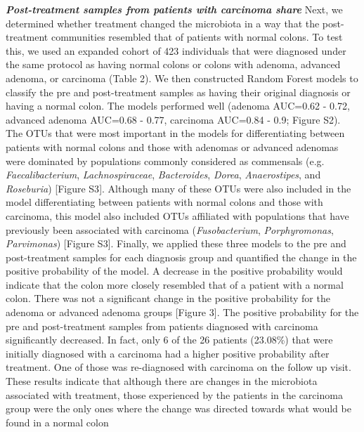 \documentclass[12pt,]{article}
\begin{document}
\textbf{\emph{Post-treatment samples from patients with carcinoma
share}} Next, we determined whether treatment changed the microbiota in
a way that the post-treatment communities resembled that of patients
with normal colons. To test this, we used an expanded cohort of 423
individuals that were diagnosed under the same protocol as having normal
colons or colons with adenoma, advanced adenoma, or carcinoma (Table 2).
We then constructed Random Forest models to classify the pre and
post-treatment samples as having their original diagnosis or having a
normal colon. The models performed well (adenoma AUC=0.62 - 0.72,
advanced adenoma AUC=0.68 - 0.77, carcinoma AUC=0.84 - 0.9; Figure S2).
The OTUs that were most important in the models for differentiating
between patients with normal colons and those with adenomas or advanced
adenomas were dominated by populations commonly considered as commensals
(e.g. \emph{Faecalibacterium}, \emph{Lachnospiraceae},
\emph{Bacteroides}, \emph{Dorea}, \emph{Anaerostipes}, and
\emph{Roseburia}) {[}Figure S3{]}. Although many of these OTUs were also
included in the model differentiating between patients with normal
colons and those with carcinoma, this model also included OTUs
affiliated with populations that have previously been associated with
carcinoma (\emph{Fusobacterium}, \emph{Porphyromonas},
\emph{Parvimonas}) {[}Figure S3{]}. Finally, we applied these three
models to the pre and post-treatment samples for each diagnosis group
and quantified the change in the positive probability of the model. A
decrease in the positive probability would indicate that the colon more
closely resembled that of a patient with a normal colon. There was not a
significant change in the positive probability for the adenoma or
advanced adenoma groups {[}Figure 3{]}. The positive probability for the
pre and post-treatment samples from patients diagnosed with carcinoma
significantly decreased. In fact, only 6 of the 26 patients (23.08\%)
that were initially diagnosed with a carcinoma had a higher positive
probability after treatment. One of those was re-diagnosed with
carcinoma on the follow up visit. These results indicate that although
there are changes in the microbiota associated with treatment, those
experienced by the patients in the carcinoma group were the only ones
where the change was directed towards what would be found in a normal
colon
\end{document}
